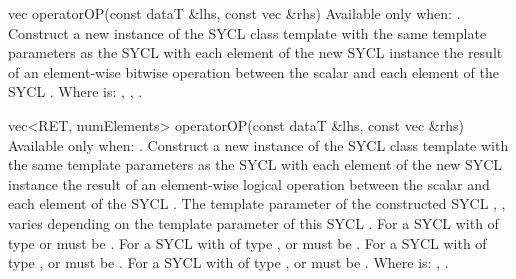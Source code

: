   \addRow
  {vec operatorOP(const dataT \&lhs, const vec \&rhs)}
  {
    Available only when: .
    \newline
    Construct a new instance of the SYCL  class template with
    the same template parameters as the  SYCL 
    with each element of the new SYCL  instance the result of
    an element-wise  bitwise operation between the  scalar and each element of the  SYCL .
    \newline \newline
    Where  is: \codeinline{\&}, \codeinline{|}, \codeinline{^}.
  }

   \addRow
  {vec<RET, numElements> operatorOP(const dataT \&lhs, const vec \&rhs)}
  {
    Available only when: .
    \newline
    Construct a new instance of the SYCL  class template with
    the same template parameters as the  SYCL 
    with each element of the new SYCL  instance the result of
    an element-wise  logical operation between the  scalar and each element of the  SYCL .
    \newline \newline
    The  template parameter of the constructed SYCL , , varies depending on the  template parameter of this SYCL . For a SYCL  with  of type  or   must be . For a SYCL  with  of type ,  or   must be . For a SYCL  with  of type ,  or   must be . For a SYCL  with  of type ,  or   must be .
    \newline \newline
    Where  is: \codeinline{\&\&}, \codeinline{||}.
  }

